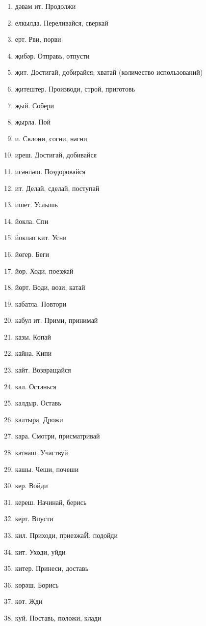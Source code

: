 \documentclass{article}
\begin{document}
\begin{enumerate}
    \item дәвам ит. Продолжи
    \item елкылда. Переливайся, сверкай
    \item ерт. Рви, порви
    \item җибәр. Отправь, отпусти
    \item җит. Достигай, добирайся; хватай (количество использований)
    \item җитештер. Производи, строй, приготовь
    \item җый. Собери
    \item җырла. Пой
    \item и. Склони, согни, нагни
    \item иреш. Достигай, добивайся
    \item исәнләш. Поздоровайся
    \item ит. Делай, сделай, поступай
    \item ишет. Услышь
    \item йокла. Спи
    \item йоклап кит. Усни
    \item йөгер. Беги
    \item йөр. Ходи, поезжай
    \item йөрт. Води, вози, катай
    \item кабатла. Повтори
    \item кабул ит. Прими, принимай
    \item казы. Копай
    \item кайна. Кипи
    \item кайт. Возвращайся
    \item кал. Останься
    \item калдыр. Оставь
    \item калтыра. Дрожи
    \item кара. Смотри, присматривай
    \item катнаш. Участвуй
    \item кашы. Чеши, почеши
    \item кер. Войди
    \item кереш. Начинай, берись
    \item керт. Впусти
    \item кил. Приходи, приезжаЙ, подойди
    \item кит. Уходи, уйди
    \item китер. Принеси, доставь
    \item көрәш. Борись
    \item көт. Жди
    \item куй. Поставь, положи, клади

\end{enumerate}
\end{document}
